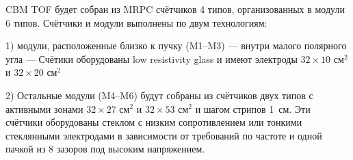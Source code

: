 CBM TOF будет собран из MRPC счётчиков 4 типов, организованных в модули 6 типов. Счётчики и модули выполнены по двум технологиям:


1) модули, расположенные близко к пучку (M1--M3) --- внутри малого полярного угла --- \todo
Счётики оборудованы low resistivity glass и имеют электроды $32 \times 10$ см$^2$ и $32 \times 20$ см$^2$



2) Остальные модули (M4--M6) будут собраны из счётчиков двух типов с активными зонами $32 \times 27$ см$^2$ и $32 \times 53$ см$^2$ и шагом стрипов 1~см. Эти счётчики оборудованы стеклом с низким сопротивлением или тонкими стеклянными электродами в зависимости от требований по частоте и одной пачкой из 8 зазоров под высоким напряжением.


